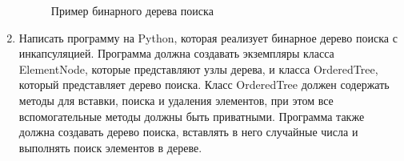 \begin{enumerate}
\begin{figure}[h]
\centering
{}
\caption{Пример бинарного дерева поиска}
\end{figure}

\item Написать программу на Python, которая реализует бинарное дерево поиска с инкапсуляцией. Программа должна создавать экземпляры класса ElementNode, которые представляют узлы дерева, и класса OrderedTree, который представляет дерево поиска. Класс OrderedTree должен содержать методы для вставки, поиска и удаления элементов, при этом все вспомогательные методы должны быть приватными. Программа также должна создавать дерево поиска, вставлять в него случайные числа и выполнять поиск элементов в дереве.


\end{enumerate}
